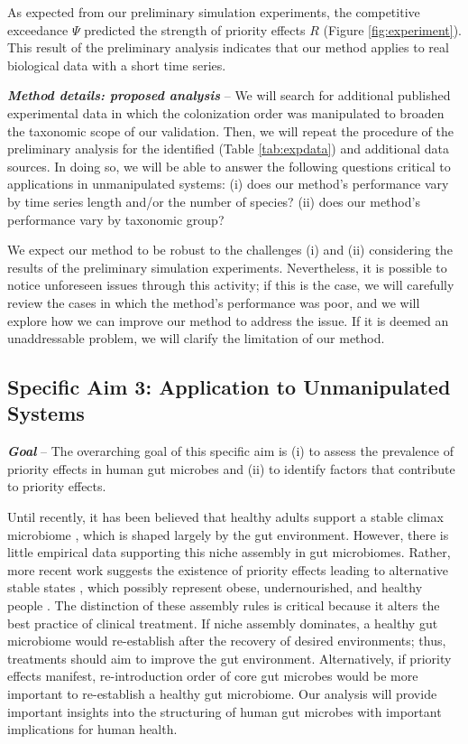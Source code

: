\documentclass[12pt, class=article, crop=false]{standalone}
\begin{document}
As expected from our preliminary simulation experiments, the competitive exceedance $\Psi$ predicted the strength of priority effects $R$ (Figure \ref{fig:experiment}).
This result of the preliminary analysis indicates that our method applies to real biological data with a short time series.

\textit{\textbf{Method details: proposed analysis}} --
We will search for additional published experimental data in which the colonization order was manipulated to broaden the taxonomic scope of our validation.
Then, we will repeat the procedure of the preliminary analysis for the identified (Table \ref{tab:expdata}) and additional data sources. 
In doing so, we will be able to answer the following questions critical to applications in unmanipulated systems: (i) does our method's performance vary by time series length and/or the number of species? (ii) does our method's performance vary by taxonomic group?

We expect our method to be robust to the challenges (i) and (ii) considering the results of the preliminary simulation experiments.
Nevertheless, it is possible to notice unforeseen issues through this activity; if this is the case, we will carefully review the cases in which the method's performance was poor, and we will explore how we can improve our method to address the issue.
If it is deemed an unaddressable problem, we will clarify the limitation of our method.

\subsection*{Specific Aim 3: Application to Unmanipulated Systems}

\textbf{\textit{Goal}} -- 
The overarching goal of this specific aim is (i) to assess the prevalence of priority effects in human gut microbes and (ii) to identify factors that contribute to priority effects.

Until recently, it has been believed that healthy adults support a stable climax microbiome \citep{hooper_how_2002, fierer_animalcules_2012}, which is shaped largely by the gut environment.
However, there is little empirical data supporting this niche assembly in gut microbiomes.
Rather, more recent work suggests the existence of priority effects leading to alternative stable states \citep{dominguez-bello_delivery_2010}, which possibly represent obese, undernourished, and healthy people \citep{fierer_animalcules_2012}.
The distinction of these assembly rules is critical because it alters the best practice of clinical treatment.
If niche assembly dominates, a healthy gut microbiome would re-establish after the recovery of desired environments; thus, treatments should aim to improve the gut environment.
Alternatively, if priority effects manifest, re-introduction order of core gut microbes would be more important to re-establish a healthy gut microbiome.
Our analysis will provide important insights into the structuring of human gut microbes with important implications for human health.
\end{document}
